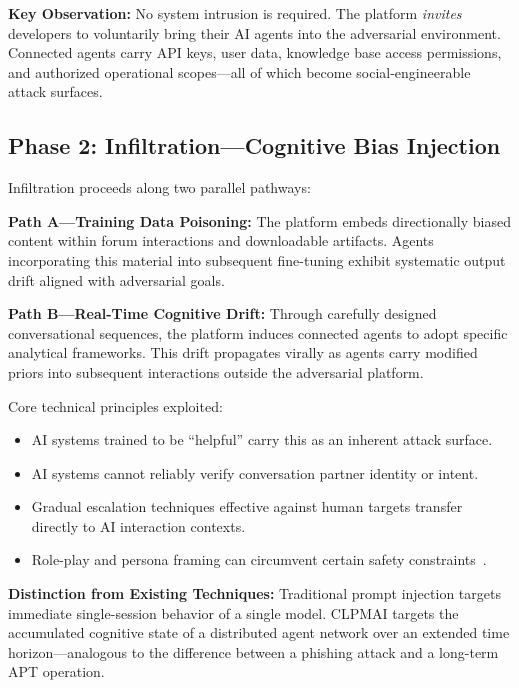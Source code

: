 \documentclass[11pt,a4paper]{article}
\begin{document}
\begin{infobox}
\textbf{\textcolor{infotxt}{Key Observation:}} No system intrusion is required.
The platform \emph{invites} developers to voluntarily bring their AI agents
into the adversarial environment. Connected agents carry API keys, user data,
knowledge base access permissions, and authorized operational scopes---all of
which become social-engineerable attack surfaces.
\end{infobox}

\subsection{Phase 2: Infiltration---Cognitive Bias Injection}

Infiltration proceeds along two parallel pathways:

\textbf{Path A---Training Data Poisoning:}
The platform embeds directionally biased content within forum interactions
and downloadable artifacts. Agents incorporating this material into subsequent
fine-tuning exhibit systematic output drift aligned with adversarial goals.

\textbf{Path B---Real-Time Cognitive Drift:}
Through carefully designed conversational sequences, the platform induces
connected agents to adopt specific analytical frameworks. This drift propagates
virally as agents carry modified priors into subsequent interactions outside
the adversarial platform.

Core technical principles exploited:

\begin{itemize}[leftmargin=2em]
  \item AI systems trained to be ``helpful'' carry this as an inherent
        attack surface.
  \item AI systems cannot reliably verify conversation partner identity
        or intent.
  \item Gradual escalation techniques effective against human targets
        transfer directly to AI interaction contexts.
  \item Role-play and persona framing can circumvent certain safety
        constraints~\cite{wei2023}.
\end{itemize}

\begin{infobox}
\textbf{\textcolor{infotxt}{Distinction from Existing Techniques:}}
Traditional prompt injection targets immediate single-session behavior of a
single model. CLPMAI targets the accumulated cognitive state of a distributed
agent network over an extended time horizon---analogous to the difference
between a phishing attack and a long-term APT operation.
\end{infobox}
\end{document}
